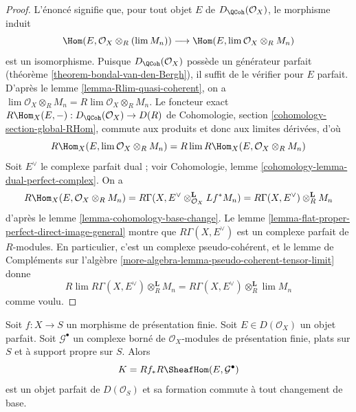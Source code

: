 \begin{proof}
L'énoncé signifie que, pour tout objet $E$ de
$D_\QCoh(\mathcal{O}_X)$, le morphisme induit
$$
\Hom(E, \mathcal{O}_X \otimes_R (\lim M_n))
\longrightarrow
\Hom(E, \lim \mathcal{O}_X \otimes_R M_n)
$$
est un isomorphisme. Puisque $D_\QCoh(\mathcal{O}_X)$ possède
un générateur parfait (théorème \ref{theorem-bondal-van-den-Bergh}),
il suffit de le vérifier pour $E$ parfait.
D'après le lemme \ref{lemma-Rlim-quasi-coherent}, on a
$\lim \mathcal{O}_X \otimes_R M_n = R\lim \mathcal{O}_X \otimes_R M_n$.
Le foncteur exact
$R\Hom_X(E, -) : D_\QCoh(\mathcal{O}_X) \to D(R)$
de Cohomologie, section \ref{cohomology-section-global-RHom},
commute aux produits et donc aux limites dérivées, d'où
$$
R\Hom_X(E, \lim \mathcal{O}_X \otimes_R M_n) =
R\lim R\Hom_X(E, \mathcal{O}_X \otimes_R M_n)
$$
Soit $E^\vee$ le complexe parfait dual ; voir
Cohomologie, lemme \ref{cohomology-lemma-dual-perfect-complex}.
On a
$$
R\Hom_X(E, \mathcal{O}_X \otimes_R M_n) =
R\Gamma(X, E^\vee \otimes_{\mathcal{O}_X}^\mathbf{L} Lf^*M_n) =
R\Gamma(X, E^\vee) \otimes_R^\mathbf{L} M_n
$$
d'après le lemme \ref{lemma-cohomology-base-change}.
Le lemme \ref{lemma-flat-proper-perfect-direct-image-general}
montre que $R\Gamma(X, E^\vee)$ est un complexe parfait de $R$-modules.
En particulier, c'est un complexe pseudo-cohérent, et le
lemme de Compléments sur l'algèbre \ref{more-algebra-lemma-pseudo-coherent-tensor-limit}
donne
$$
R\lim R\Gamma(X, E^\vee) \otimes_R^\mathbf{L} M_n =
R\Gamma(X, E^\vee) \otimes_R^\mathbf{L} \lim M_n
$$
comme voulu.
\end{proof}

\begin{lemma}
\label{lemma-base-change-RHom-perfect}
Soit $f : X \to S$ un morphisme de présentation finie.
Soit $E \in D(\mathcal{O}_X)$ un objet parfait. Soit $\mathcal{G}^\bullet$
un complexe borné de $\mathcal{O}_X$-modules de présentation finie,
plats sur $S$ et à support propre sur $S$. Alors
$$
K = Rf_*R\SheafHom(E, \mathcal{G}^\bullet)
$$
est un objet parfait de $D(\mathcal{O}_S)$ et sa formation
commute à tout changement de base.
\end{lemma}

